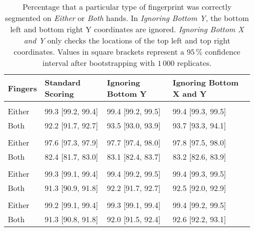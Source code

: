 \documentclass[]{article}
\begin{document}
\begin{table}[!h]

\caption{\label{tab:twoinch-per-finger-type-ci}Percentage that a particular type of fingerprint was correctly segmented on \textit{Either} or \textit{Both} hands. In \textit{Ignoring Bottom Y}, the bottom left and bottom right Y coordinates are ignored. \textit{Ignoring Bottom X and Y} only checks the locations of the top left and top right coordinates. Values in square brackets represent a \(95\,\%\) confidence interval after bootstrapping with \(1\,000\) replicates.}
\centering
\begin{tabular}{llll}
\toprule
Fingers & Standard Scoring & Ignoring Bottom Y & Ignoring Bottom X and Y\\
\midrule
\addlinespace[0.3em]
\multicolumn{4}{l}{\textbf{Index}}\\
\rowcolor{gray!6}  \hspace{1em}Either & 99.3 [99.2, 99.4] & 99.4 [99.2, 99.5] & 99.4 [99.3, 99.5]\\
\hspace{1em}Both & 92.2 [91.7, 92.7] & 93.5 [93.0, 93.9] & 93.7 [93.3, 94.1]\\
\addlinespace[0.3em]
\multicolumn{4}{l}{\textbf{Middle}}\\
\rowcolor{gray!6}  \hspace{1em}Either & 97.6 [97.3, 97.9] & 97.7 [97.4, 98.0] & 97.8 [97.5, 98.0]\\
\hspace{1em}Both & 82.4 [81.7, 83.0] & 83.1 [82.4, 83.7] & 83.2 [82.6, 83.9]\\
\addlinespace[0.3em]
\multicolumn{4}{l}{\textbf{Ring}}\\
\rowcolor{gray!6}  \hspace{1em}Either & 99.3 [99.1, 99.4] & 99.4 [99.2, 99.5] & 99.4 [99.3, 99.5]\\
\hspace{1em}Both & 91.3 [90.9, 91.8] & 92.2 [91.7, 92.7] & 92.5 [92.0, 92.9]\\
\addlinespace[0.3em]
\multicolumn{4}{l}{\textbf{Little}}\\
\rowcolor{gray!6}  \hspace{1em}Either & 99.2 [99.1, 99.4] & 99.3 [99.1, 99.4] & 99.4 [99.2, 99.5]\\
\hspace{1em}Both & 91.3 [90.8, 91.8] & 92.0 [91.5, 92.4] & 92.6 [92.2, 93.1]\\
\bottomrule
\end{tabular}
\end{table}
\end{document}
